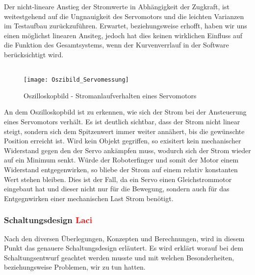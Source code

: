 \documentclass[titlepage,12pt,twoside]{article}
\begin{document}
\hfill \break
Der nicht-lineare Anstieg der Stromwerte in Abhängigkeit der Zugkraft, ist weitestgehend auf die Ungnauigkeit des Servomotors
und die leichten Varianzen im Testaufbau zurückzuführen. Erwartet, beziehungsweise erhofft, haben wir uns einen möglichst linearen
Ansiteg, jedoch hat dies keinen wirklichen Einfluss auf die Funktion des Gesamtsystems, wenn der Kurvenverrlauf in der Software
berücksichtigt wird. \\
\\
\begin{figure}[H]
	\begin{center}
		\scalebox{1.2}
		{\texttt{[image: Oszibild\_Servomessung]}}
		\caption{Oszilloskopbild - Stromanlaufverhalten eines Servomotors}
		\label{fig:Oszibild_Servomessung}	
	\end{center}
\end{figure}
\hfill \break
An dem Oszilloskopbild ist zu erkennen, wie sich der Strom bei der Ansteuerung eines Servomotors verhält. Es ist deutlich sichtbar,
dass der Strom nicht linear steigt, sondern sich dem Spitzenwert immer weiter annähert, bis die gewünschte Position erreicht ist.
Wird kein Objekt gegriffen, so exisitert kein mechanischer Widerstand gegen den der Servo ankämpfen muss, wodurch sich der Strom
wieder auf ein Minimum senkt. Würde der Roboterfinger und somit der Motor einem Widerstand entgegenwirken, so bliebe der Strom auf
einem relativ konstanten Wert stehen bleiben. Dies ist der Fall, da ein Servo einen Gleichstrommotor eingebaut hat und dieser nicht 
nur für die Bewegung, sondern auch für das Entgegnwirken einer mechanischen Last Strom benötigt. 

\subsubsection{Schaltungsdesign \textcolor{red}{Laci}}
\label{chap:Schaltungsdesign_Roboterhand}
Nach den diversen Überlegungen, Konzepten und Berechnungen, wird in diesem Punkt das genauere Schaltungsdesign erläutert. Es wird
erklärt worauf bei dem Schaltungsentwurf geachtet werden musste und mit welchen Besonderheiten, beziehungsweise Problemen, wir zu
tun hatten. 
\end{document}
